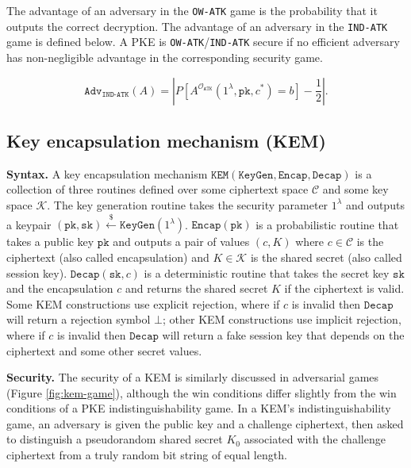 \documentclass[runningheads]{llncs}
\newcommand{\keygen}{\texttt{KeyGen}}
\newcommand{\kem}{\texttt{KEM}}
\newcommand{\encap}{\texttt{Encap}}
\newcommand{\decap}{\texttt{Decap}}
\newcommand{\pk}{\texttt{pk}}
\newcommand{\sk}{\texttt{sk}}
\newcommand{\leftsample}{\stackrel{\$}{\leftarrow}}
\begin{document}
The advantage of an adversary in the \texttt{OW-ATK} game is the probability that it outputs the correct decryption. The advantage of an adversary in the \texttt{IND-ATK} game is defined below. A PKE is \texttt{OW-ATK}/\texttt{IND-ATK} secure if no efficient adversary has non-negligible advantage in the corresponding security game.

\begin{equation*}
    \texttt{Adv}_\texttt{IND-ATK}(A) = \left\vert P\left[A^{\mathcal{O}_\texttt{ATK}}(1^\lambda, \pk, c^\ast) = b \right] - \frac{1}{2} \right\vert.
\end{equation*}

\subsection{Key encapsulation mechanism (KEM)}
\textbf{Syntax.} A key encapsulation mechanism $\kem(\keygen, \encap, \decap)$ is a collection of three routines defined over some ciphertext space $\mathcal{C}$ and some key space $\mathcal{K}$. The key generation routine takes the security parameter $1^\lambda$ and outputs a keypair $(\pk, \sk) \leftsample \keygen(1^\lambda)$. $\encap(\pk)$ is a probabilistic routine that takes a public key $\pk$ and outputs a pair of values $(c, K)$ where $c \in \mathcal{C}$ is the ciphertext (also called encapsulation) and $K \in \mathcal{K}$ is the shared secret (also called session key). $\decap(\sk, c)$ is a deterministic routine that takes the secret key $\sk$ and the encapsulation $c$ and returns the shared secret $K$ if the ciphertext is valid. Some KEM constructions use explicit rejection, where if $c$ is invalid then $\decap$ will return a rejection symbol $\bot$; other KEM constructions use implicit rejection, where if $c$ is invalid then $\decap$ will return a fake session key that depends on the ciphertext and some other secret values.

\textbf{Security.} The security of a KEM is similarly discussed in adversarial games (Figure \ref{fig:kem-game}), although the win conditions differ slightly from the win conditions of a PKE indistinguishability game. In a KEM's indistinguishability game, an adversary is given the public key and a challenge ciphertext, then asked to distinguish a pseudorandom shared secret $K_0$ associated with the challenge ciphertext from a truly random bit string of equal length.
\end{document}
